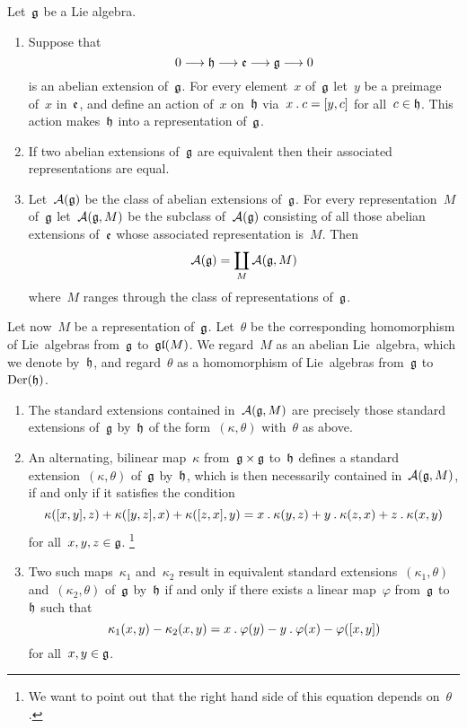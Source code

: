 \begin{theorem}
	\label{structure of abelian extensions}
	Let~$\mathfrak{g}$ be a Lie algebra.
	\begin{enumerate}
		\item
			Suppose that
			\[
				0
				\to
				\hlie
				\to
				\elie
				\to
				\glie
				\to
				0
			\]
			is an abelian extension of~$\mathfrak{g}$.
			For every element~$x$ of~$\mathfrak{g}$ let~$y$ be a preimage of~$x$ in~$\mathfrak{e}$, and define an action of~$x$ on~$\mathfrak{h}$ via~$x \mathbin{.} c = [y,c]$ for all~$c \in \mathfrak{h}$.
			This action makes~$\mathfrak{h}$ into a representation of~$\mathfrak{g}$.
		\item
			If two abelian extensions of~$\mathfrak{g}$ are equivalent then their associated representations are equal.
		\item
			Let~$\mathcal{A}(\mathfrak{g})$ be the class of abelian extensions of~$\mathfrak{g}$.
			For every representation~$M$ of~$\mathfrak{g}$ let~$\mathcal{A}(\mathfrak{g}, M)$ be the subclass of~$\mathcal{A}(\mathfrak{g})$ consisting of all those abelian extensions of~$\mathfrak{e}$ whose associated representation is~$M$.
			Then
			\[
				\mathcal{A}(\mathfrak{g})
				=
				\coprod_M \mathcal{A}(\mathfrak{g}, M)
			\]
			where~$M$ ranges through the class of representations of~$\mathfrak{g}$.
	\end{enumerate}
	Let now~$M$ be a representation of~$\mathfrak{g}$.
	Let~$\theta$ be the corresponding homomorphism of Lie~algebras from~$\mathfrak{g}$ to~$\mathfrak{gl}(M)$.
	We regard~$M$ as an abelian Lie~algebra, which we denote by~$\mathfrak{h}$, and regard~$\theta$ as a homomorphism of Lie~algebras from~$\mathfrak{g}$ to~$\operatorname{Der}(\mathfrak{h})$.
	\begin{enumerate}[resume*]
		\item
			The standard extensions contained in~$\mathcal{A}(\mathfrak{g}, M)$ are precisely those standard extensions of~$\mathfrak{g}$ by~$\mathfrak{h}$ of the form~$(\kappa, \theta)$ with~$\theta$ as above.
		\item
			An alternating, bilinear map~$\kappa$ from~$\mathfrak{g} \times \mathfrak{g}$ to~$\mathfrak{h}$ defines a standard extension~$(\kappa, \theta)$ of~$\mathfrak{g}$ by~$\mathfrak{h}$, which is then necessarily contained in~$\mathcal{A}(\mathfrak{g}, M)$, if and only if it satisfies the condition
			\[
				\kappa( [x,y], z ) + \kappa( [y,z], x ) + \kappa( [z,x], y )
				=
				x \mathbin{.} \kappa(y,z) + y \mathbin{.} \kappa(z,x) + z \mathbin{.} \kappa(x,y)
			\]
			for all~$x, y, z \in \mathfrak{g}$.%
			\footnote{
				We want to point out that the right hand side of this equation depends on~$\theta$.
			}
		\item
			Two such maps~$\kappa_1$ and~$\kappa_2$ result in equivalent standard extensions~$(\kappa_1, \theta)$ and~$(\kappa_2, \theta)$ of~$\mathfrak{g}$ by~$\mathfrak{h}$ if and only if there exists a linear map~$\varphi$ from~$\mathfrak{g}$ to~$\mathfrak{h}$ such that
			\[
				\kappa_1(x,y)
				- \kappa_2(x,y)
				=
				x \mathbin{.} \varphi(y)
				- y \mathbin{.} \varphi(x)
				- \varphi( [x,y] )
			\]
			for all~$x, y \in \mathfrak{g}$.
	\end{enumerate}
\end{theorem}


